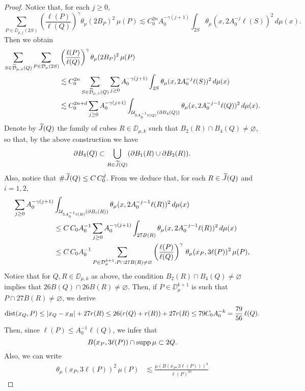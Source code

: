 \begin{proof}
	Notice that, for each $j\geq0$,
	$$
	\sum_{P\in\DD_{\mu,j}(2S)} \left(\frac{\ell(P)}{\ell(Q)}\right)^\gamma\theta_\mu(2B_P)^2\,\mu(P)
	\lesssim C_0^{2n}A_0^{-\gamma(j+1)} \int_{2S} \theta_\mu(x,2A_0^{-j}\ell(S))^2\,d\mu(x).$$
	Then we obtain
	\begin{align}\label{eqhfk2}
		\sum_{S\in{\widetilde{{\mathcal D}}}_{\mu,1}(Q)} \sum_{P\in{\mathcal D}_\mu(2S)}& \left(\frac{\ell(P)}{\ell(Q)}\right)^\gamma\theta_\mu(2B_P)^2\,\mu(P) \\
		&\lesssim C_0^{2n}
		\sum_{S\in{\widetilde{{\mathcal D}}}_{\mu,1}(Q)} \sum_{j\geq0} A_0^{-\gamma(j+1)} \int_{2S} \theta_\mu(x,2A_0^{-j}\ell(S))^2\,d\mu(x)\nonumber\\
		& \lesssim C_0^{2n+d}
		\sum_{j\geq0} A_0^{-\gamma(j+1)} \int_{{\mathcal U}_{5A_0^{-1}\ell(Q)}(\partial B_4(Q))}
		\theta_\mu(x,2A_0^{-j-1}\ell(Q))^2\,d\mu(x).\nonumber
	\end{align}
	Denote by ${\widetilde{J}}(Q)$ the family of cubes $R\in\DD_{\mu,k}$ such that $B_2(R)\cap B_4(Q)\neq\varnothing$, so that, by the above construction we have
	$$\partial B_4(Q)\subset \bigcup_{R\in {\widetilde{J}}(Q)} (\partial B_1(R) 
	\cup \partial B_2(R)).$$
	Also, notice that $\#{\widetilde{J}}(Q)\leq C\,C_0^d$.
	From  we deduce that, for each $R\in{\widetilde{J}}(Q)$ and $i=1,2$,
	\begin{align}\label{eqrig56}
		\sum_{j\geq0} A_0^{-\gamma(j+1)} &\int_{{\mathcal U}_{5A_0^{-1}\ell(R)}(\partial B_i(R))}
		\theta_\mu(x,2A_0^{-j-1}\ell(R))^2\,d\mu(x)\\
		& \leq C\,C_0A_0^{-1}
		\sum_{j\geq0} A_0^{-\gamma(j+1)} \int_{27B(R)}
		\theta_\mu(x,2A_0^{-j-1}\ell(R))^2\,d\mu(x)\nonumber \\
		& \leq C\,C_0A_0^{-1}
		\sum_{P\in {\mathcal D}_\mu^{k+1}:P\cap 27B(R)\neq\varnothing}\left(\frac{\ell(P)}{\ell(Q)}\right)^\gamma\, \theta_\mu(x_P,3\ell(P))^2\,\mu(P),\nonumber
	\end{align}
	Notice that for $Q,R\in\DD_{\mu,k}$ as above, the condition $B_2(R)\cap B_4(Q)\neq\varnothing$ implies that $26B(Q) \cap 26B(R)\neq\varnothing$. Then, if
	$P\in \DD_\mu^{k+1}$ is such that $P\cap 27B(R)\neq\varnothing$, we derive
	$${\rm dist}(x_Q,P)\leq |x_Q-x_R| + 27 r(R)
	\leq 26(r(Q) + r(R)) + 27 r(R) \leq 
	79C_0A_0^{-k} = \frac{79}{56}\,\ell(Q).$$
	Then, since $\ell(P)\leq A_0^{-1}\ell(Q)$, we infer that
	\begin{equation}\label{eqinc732}
		B(x_P,3\ell(P))\cap\operatorname{supp}\mu\subset 2Q.
	\end{equation}
	Also, we can write
	\begin{align*}
		\theta_\mu(x_P,3\ell(P))^2\,\mu(P) &\lesssim \frac{\mu(B(x_P,3\ell(P)))^3}{\ell(P)^{2n}}

\end{align*}
\end{proof}
